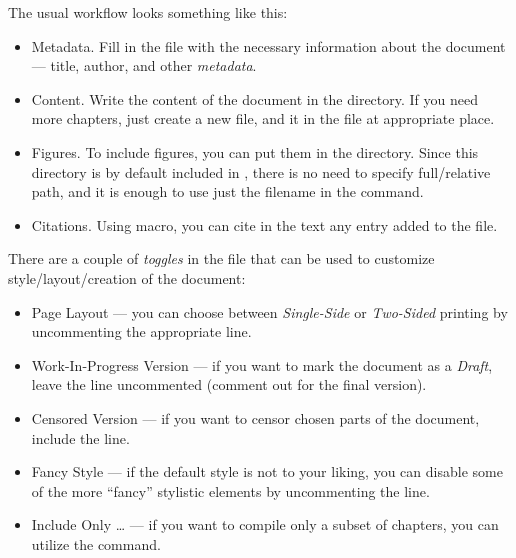 The usual workflow looks something like this:
\begin{itemize}
    \item \textsf{Metadata.} Fill in the  file with the necessary information about the document --- title, author, and other \emph{metadata}.
    \item \textsf{Content.} Write the content of the document in the  directory.
          If you need more chapters, just create a new file, and \macro{} it in the  file at appropriate place.
    \item \textsf{Figures.} To include figures, you can put them in the  directory.
          Since this directory is by default included in \macro{\graphicspath}, there is no need to specify full/relative path, and it is enough to use just the filename in the  command.
    \item \textsf{Citations.} Using  \macro{\autocite} macro, you can cite in the text any entry added to the  file.
\end{itemize}

\begin{remark}[Toggles]
    There are a couple of \emph{toggles} in the  file that can be used to customize style/layout/creation of the document:
    \begin{itemize}
        \item \textsf{Page Layout} --- you can choose between \emph{Single-Side} or \emph{Two-Sided} printing by uncommenting the appropriate \macro{\documentclass} line.
        \item \textsf{Work-In-Progress Version} --- if you want to mark the document as a \emph{Draft}, leave the \macro{\WIPtrue} line uncommented (comment out for the final version).
        \item \textsf{Censored Version} --- if you want to censor chosen parts of the document, include the \macro{\CENSORtrue} line.
        \item \textsf{Fancy Style} --- if the default style is not to your liking, you can disable some of the more \enquote{fancy} stylistic elements by uncommenting the \macro{\FANCYtrue} line.
        \item \textsf{Include Only \ldots{}} --- if you want to compile only a subset of chapters, you can utilize the  command. \qedhere*
    \end{itemize}
\end{remark}

